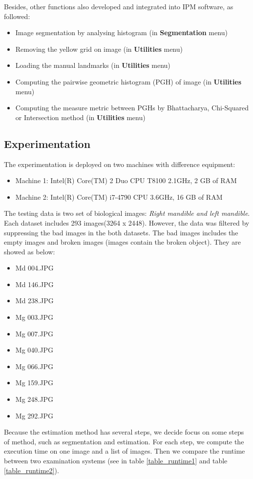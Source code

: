 Besides, other functions also developed and integrated into IPM software, as followed:
\begin{itemize}
\item Image segmentation by analysing histogram (in \textbf{Segmentation} menu)
\item Removing the yellow grid on image (in \textbf{Utilities} menu)
\item Loading the manual landmarks (in \textbf{Utilities} menu)
\item Computing the pairwise geometric histogram (PGH) of image (in \textbf{Utilities} menu)
\item Computing the measure metric between PGHs by Bhattacharya, Chi-Squared or Intersection method (in \textbf{Utilities} menu)
\end{itemize}
\subsection{Experimentation}
The experimentation is deployed on two machines with difference equipment:
\begin{itemize}
\item Machine 1: Intel(R) Core(TM) 2 Duo CPU T8100 2.1GHz, 2 GB of RAM
\item Machine 2: Intel(R) Core(TM) i7-4790 CPU 3.6GHz, 16 GB of RAM
\end{itemize}
The testing data is two set of biological images: \textit{Right mandible and left mandible}. Each dataset includes 293 images(3264 x 2448). However, the data was filtered by suppressing the bad images in the both datasets. The bad images includes the empty images and broken images (images contain the broken object). They are showed as below:
\begin{multicols}{3}
\begin{itemize}
\item Md 004.JPG
\item Md 146.JPG
\item Md 238.JPG
\item Mg 003.JPG
\item Mg 007.JPG
\item Mg 040.JPG
\item Mg 066.JPG
\item Mg 159.JPG
\item Mg 248.JPG
\item Mg 292.JPG
\end{itemize} 
\end{multicols}
Because the estimation method has several steps, we decide focus on some steps of method, such as segmentation and estimation. For each step, we compute the execution time on one image and a list of images. Then we compare the runtime between two examination systems (see in table \ref{table_runtime1} and table \ref{table_runtime2}).

